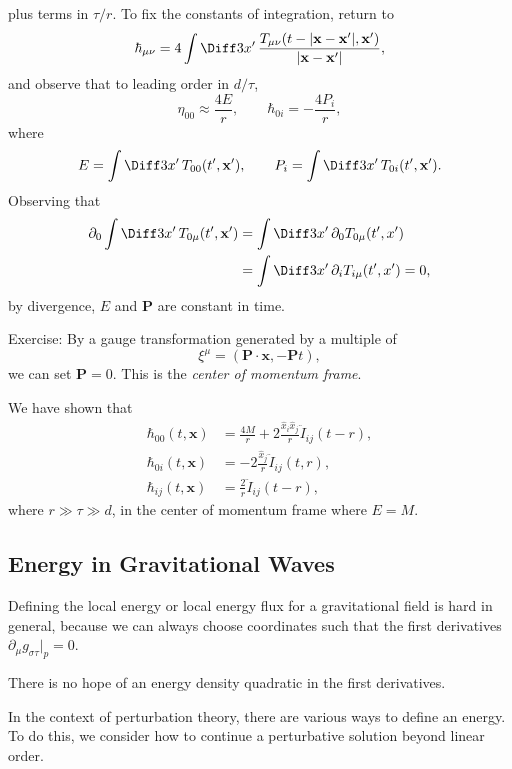 \documentclass[12pt]{article}
\begin{document}
plus terms in $\tau/r$. To fix the constants of integration, return to
\[
\hbar_{\mu\nu} = 4 \int \Diff 3 x' \, \frac{T_{\mu\nu}(t - |\mathbf{x} - \mathbf{x}'|, \mathbf{x}')}{|\mathbf{x} - \mathbf{x}'|},
\]
and observe that to leading order in $d/\tau$,
\[
\eta_{00} \approx \frac{4E}{r}, \qquad \hbar_{0i} = - \frac{4P_i}{r},
\]
where
\[
E = \int \Diff 3 x'\, T_{00}(t', \mathbf{x}'), \qquad P_i = \int \Diff 3 x' \, T_{0i} (t', \mathbf{x}').
\]
Observing that
\begin{align*}
	\partial_0 \int \Diff 3 x' \, T_{0\mu}(t', \mathbf{x}') &= \int \Diff 3 x' \, \partial_0 T_{0\mu} (t', x') \\
								&= \int \Diff 3 x'\, \partial_i T_{i\mu}(t', x') = 0,
\end{align*}
by divergence, $E$ and $\mathbf{P}$ are constant in time.

Exercise: By a gauge transformation generated by a multiple of
\[
\xi^\mu = (\mathbf{P} \cdot \mathbf{x}, - \mathbf{P} t),
\]
we can set $\mathbf{P} = 0$. This is the \emph{center of momentum frame}.

We have shown that
\begin{align*}
	\hbar_{00}(t, \mathbf{x}) &= \frac{4M}{r} + 2 \frac{\hat x_i \hat x_j}{r} \ddot I_{ij}(t - r), \\
	\hbar_{0i}(t, \mathbf{x}) &= - 2 \frac{\hat x_j}{r} \ddot I_{ij}(t, r), \\
	\hbar_{ij}(t, \mathbf{x}) &= \frac 2r \ddot I_{ij}(t - r),
\end{align*}
where $r \gg \tau \gg d$, in the center of momentum frame where $E = M$.


\subsection{Energy in Gravitational Waves}%
\label{sub:egw}

Defining the local energy or local energy flux for a gravitational field is hard in general, because we can always choose coordinates such that the first derivatives $\partial_\mu g_{\sigma\tau}|_p = 0$.

There is no hope of an energy density quadratic in the first derivatives.

In the context of perturbation theory, there are various ways to define an energy. To do this, we consider how to continue a perturbative solution beyond linear order.
\end{document}
